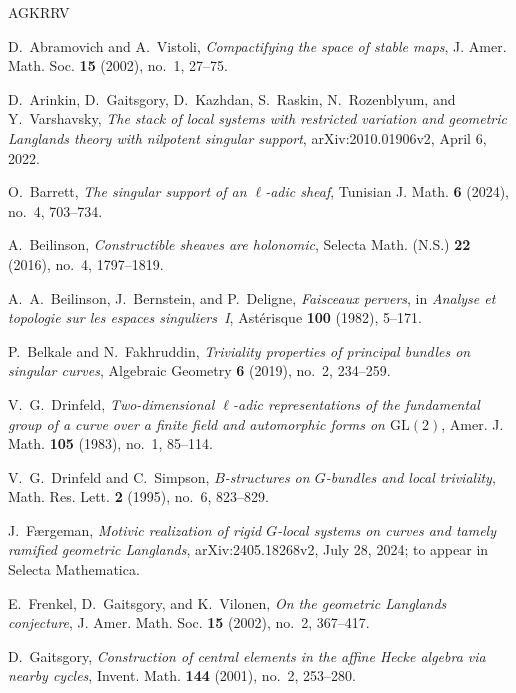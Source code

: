 \begin{thebibliography}{AGKRRV}

D.~Abramovich and A.~Vistoli, \emph{Compactifying the space of stable maps},
J. Amer. Math. Soc. \textbf{15} (2002), no.~1, 27--75.

D.~Arinkin, D.~Gaitsgory, D.~Kazhdan, S.~Raskin, N.~Rozenblyum, and
Y.~Varshavsky, \emph{The stack of local systems with restricted variation
and geometric Langlands theory with nilpotent singular support},
arXiv:2010.01906v2, April 6, 2022.

O.~Barrett, \emph{The singular support of an $\ell$-adic sheaf},
Tunisian J. Math. \textbf{6} (2024), no.~4, 703--734.

A.~Beilinson, \emph{Constructible sheaves are holonomic},
Selecta Math. (N.S.) \textbf{22} (2016), no.~4, 1797--1819.

A.~A.~Beilinson, J.~Bernstein, and P.~Deligne, \emph{Faisceaux pervers},
in \emph{Analyse et topologie sur les espaces singuliers~I},
Ast\'erisque \textbf{100} (1982), 5--171.

P.~Belkale and N.~Fakhruddin, \emph{Triviality properties of principal
bundles on singular curves}, Algebraic Geometry \textbf{6} (2019),
no.~2, 234--259.

V.~G.~Drinfeld, \emph{Two-dimensional $\ell$-adic representations of
the fundamental group of a curve over a finite field and automorphic
forms on $\mathrm{GL}(2)$}, Amer. J. Math. \textbf{105} (1983), no.~1,
85--114.

V.~G.~Drinfeld and C.~Simpson, \emph{$B$-structures on $G$-bundles and
local triviality}, Math. Res. Lett. \textbf{2} (1995), no.~6, 823--829.

J.~F\ae rgeman, \emph{Motivic realization of rigid $G$-local systems on
curves and tamely ramified geometric Langlands},
arXiv:2405.18268v2, July 28, 2024; to appear in Selecta Mathematica.

E.~Frenkel, D.~Gaitsgory, and K.~Vilonen, \emph{On the geometric
Langlands conjecture}, J. Amer. Math. Soc. \textbf{15} (2002), no.~2,
367--417.

D.~Gaitsgory, \emph{Construction of central elements in the affine
Hecke algebra via nearby cycles}, Invent. Math. \textbf{144} (2001),
no.~2, 253--280.


\end{thebibliography}
